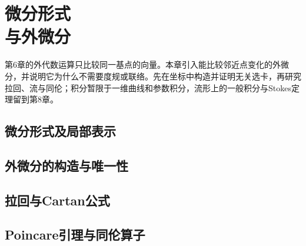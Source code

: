 \chapter[微分形式与外微分]{微分形式\\与外微分}
\label{ch:07-forms}

第6章的外代数运算只比较同一基点的向量。本章引入能比较邻近点变化的外微分，并说明它为什么不需要度规或联络。先在坐标中构造并证明无关选卡，再研究拉回、流与同伦；积分暂限于一维曲线和参数积分，流形上的一般积分与Stokes定理留到第8章。

\section{微分形式及局部表示}


\section{外微分的构造与唯一性}


\section{拉回与Cartan公式}


\section{Poincare引理与同伦算子}



